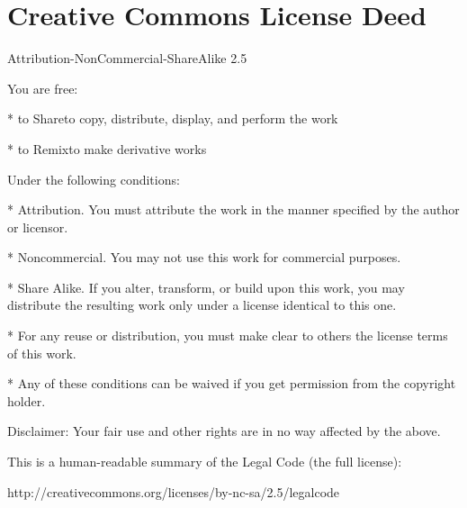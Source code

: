 \section{Creative Commons License Deed}

Attribution-NonCommercial-ShareAlike 2.5

You are free:

* to Share\dash{}to copy, distribute, display, and perform the work

* to Remix\dash{}to make derivative works

Under the following conditions:

* Attribution. You must attribute the work in the manner specified
by the author or licensor.

* Noncommercial. You may not use this work for commercial
purposes.

* Share Alike. If you alter, transform, or build upon this work,
you may distribute the resulting work only under a license
identical to this one.



* For any reuse or distribution, you must make clear to others the
license terms of this work.

* Any of these conditions can be waived if you get permission from
the copyright holder.

Disclaimer: Your fair use and other rights are in no way affected
by the above.

This is a human-readable summary of the Legal Code (the full
license):

http://creativecommons.org/licenses/by-nc-sa/2.5/legalcode


